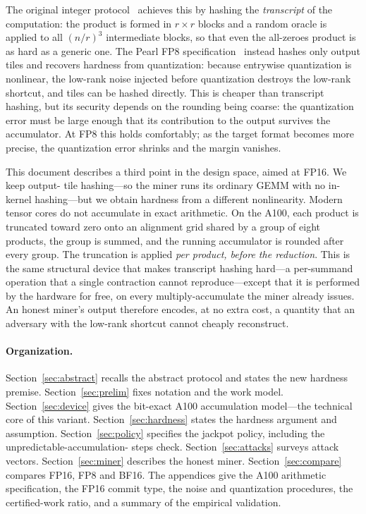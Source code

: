 \documentclass[11pt]{article}
\newcommand{\FP}[1]{\textsf{FP#1}}
\begin{document}
The original integer protocol~\cite{KW25} achieves this by hashing the \emph{transcript} of
the computation: the product is formed in $r\times r$ blocks and a random oracle is applied to
all $(n/r)^3$ intermediate blocks, so that even the all-zeroes product is as hard as a generic
one. The Pearl \FP{8} specification~\cite{PearlFP8} instead hashes only output tiles and
recovers hardness from quantization: because entrywise quantization is nonlinear, the low-rank
noise injected before quantization destroys the low-rank shortcut, and tiles can be hashed
directly. This is cheaper than transcript hashing, but its security depends on the rounding
being coarse: the quantization error must be large enough that its contribution to the output
survives the accumulator. At \FP{8} this holds comfortably; as the target format becomes more
precise, the quantization error shrinks and the margin vanishes.

This document describes a third point in the design space, aimed at \FP{16}. We keep output-
tile hashing---so the miner runs its ordinary GEMM with no in-kernel hashing---but we obtain
hardness from a different nonlinearity. Modern tensor cores do not accumulate in exact
arithmetic. On the A100, each product is truncated toward zero onto an alignment grid shared by
a group of eight products, the group is summed, and the running accumulator is rounded after
every group. The truncation is applied \emph{per product, before the reduction}. This is the
same structural device that makes transcript hashing hard---a per-summand operation that a
single contraction cannot reproduce---except that it is performed by the hardware for free, on
every multiply-accumulate the miner already issues. An honest miner's output therefore encodes,
at no extra cost, a quantity that an adversary with the low-rank shortcut cannot cheaply
reconstruct.

\paragraph{Organization.} Section~\ref{sec:abstract} recalls the abstract protocol and states
the new hardness premise. Section~\ref{sec:prelim} fixes notation and the work model.
Section~\ref{sec:device} gives the bit-exact A100 accumulation model---the technical core of
this variant. Section~\ref{sec:hardness} states the hardness argument and assumption.
Section~\ref{sec:policy} specifies the jackpot policy, including the unpredictable-accumulation-
steps check. Section~\ref{sec:attacks} surveys attack vectors. Section~\ref{sec:miner}
describes the honest miner. Section~\ref{sec:compare} compares \FP{16}, \FP{8} and \textsf{BF16}.
The appendices give the A100 arithmetic specification, the \FP{16} commit type, the noise and
quantization procedures, the certified-work ratio, and a summary of the empirical validation.
\end{document}
